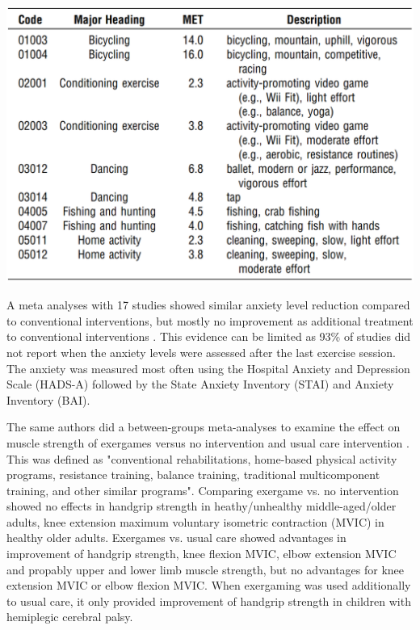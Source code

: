 \includegraphics[width=\linewidth]{"MET-physical-activities.png"}

A meta analyses with 17 studies showed similar anxiety level reduction compared to conventional interventions, but mostly no improvement as additional treatment to conventional interventions \cite{viana2020effects}. This evidence can be limited as 93\% of studies did not report when the anxiety levels were assessed after the last exercise session. The anxiety was measured most often using the Hospital Anxiety and Depression Scale (HADS-A) followed by the State Anxiety Inventory (STAI) and Anxiety Inventory (BAI).

The same authors did a between-­groups meta-­analyses to examine the effect on muscle strength of exergames versus no intervention and usual care intervention \cite{viana2021effects}. This was defined as "conventional rehabilitations, home-­based physical activity programs, resistance training, balance training, traditional multicomponent training, and other similar programs".
Comparing exergame vs. no intervention showed no effects in handgrip strength in heathy/unhealthy middle-­aged/older adults, knee extension maximum voluntary isometric contraction (MVIC) in healthy older adults. Exergames vs. usual care showed advantages in improvement of handgrip strength, knee flexion MVIC, elbow extension MVIC and propably upper and lower limb muscle strength, but no advantages for knee extension MVIC or elbow flexion MVIC. When exergaming was used additionally to usual care, it only provided improvement of handgrip strength in children with hemiplegic cerebral palsy.

